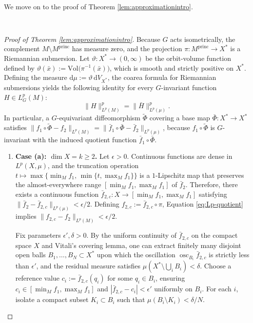 \documentclass[12pt,a4paper]{amsart}
\theoremstyle{plain}
\theoremstyle{definition}
\theoremstyle{remark}
\begin{document}
\ 

We move on to the proof of Theorem \ref{lem:approximationintro}.

\ 

\begin{proof}[Proof of Theorem \ref{lem:approximationintro}]
Because $G$ acts isometrically, the complement $M \setminus M^{\mathrm{princ}}$ has measure zero, and the projection $\pi \colon M^{\mathrm{princ}} \to X^*$ is a Riemannian submersion. Let $\vartheta \colon X^* \to (0,\infty)$ be the orbit-volume function defined by $\vartheta(\bar{x}) := \mathrm{Vol}\bigl(\pi^{-1}(\bar{x})\bigr)$, which is smooth and strictly positive on $X^*$. Defining the measure $\mathrm{d}\mu := \vartheta\,\mathrm{d}V_{X^*}$, the coarea formula for Riemannian submersions yields the following identity for every $G$-invariant function $H \in L^p_G(M)$:
\begin{equation}\label{eq:Lp-quotient}
  \|H\|_{L^p(M)}^p = \|\bar{H}\|_{L^p(\mu)}^p.
\end{equation}
In particular, a $G$-equivariant diffeomorphism $\widetilde{\Phi}$ covering a base map $\bar{\Phi} \colon X^* \to X^*$ satisfies $\|f_1 \circ \widetilde{\Phi} - f_2\|_{L^p(M)} = \|\bar{f}_1 \circ \bar{\Phi} - \bar{f}_2\|_{L^p(\mu)}$, because $f_1 \circ \widetilde{\Phi}$ is $G$-invariant with the induced quotient function $\bar{f}_1 \circ \bar{\Phi}$.

\begin{enumerate}[label=\textup{(\alph*)}, font=\upshape]
  \item \textbf{Case \textup{(a):} $\dim X = k \ge 2$.} Let $\epsilon > 0$. Continuous functions are dense in $L^p(X,\mu)$, and the truncation operation $t \mapsto \max\{\min_M f_1,\, \min\{t, \max_M f_1\}\}$ is a $1$-Lipschitz map that preserves the almost-everywhere range $[\min_M f_1, \max_M f_1]$ of $\bar{f}_2$. Therefore, there exists a continuous function $\bar{f}_{2,c} \colon X \to [\min_M f_1, \max_M f_1]$ satisfying $\|\bar{f}_2 - \bar{f}_{2,c}\|_{L^p(\mu)} < \epsilon/2$. Defining $f_{2,c} := \bar{f}_{2,c} \circ \pi$, Equation \eqref{eq:Lp-quotient} implies $\|f_{2,c} - f_2\|_{L^p(M)} < \epsilon/2$.

  Fix parameters $\epsilon', \delta > 0$. By the uniform continuity of $\bar{f}_{2,c}$ on the compact space $X$ and Vitali's covering lemma, one can extract finitely many disjoint open balls $B_1, \dots, B_N \subset X^*$ upon which the oscillation $\operatorname{osc}_{B_i} \bar{f}_{2,c}$ is strictly less than $\epsilon'$, and the residual measure satisfies $\mu(X^* \setminus \bigcup_i B_i) < \delta$. Choose a reference value $c_i := \bar{f}_{2,c}(q_i)$ for some $q_i \in B_i$, ensuring $c_i \in [\min_M f_1, \max_M f_1]$ and $|\bar{f}_{2,c} - c_i| < \epsilon'$ uniformly on $B_i$. For each $i$, isolate a compact subset $K_i \subset B_i$ such that $\mu(B_i \setminus K_i) < \delta/N$.


\end{enumerate}
\end{proof}
\end{document}
